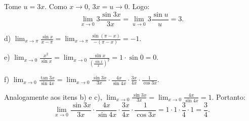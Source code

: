 \documentclass{article}
\begin{document}
{\begin{newpage}
\par
\vspace{0.3cm}
Tome $u = 3x$. Como $x\rightarrow 0$, $3x=u\rightarrow 0$. Logo:
\begin{equation*} \displaystyle{\lim_{x\to 0} 3\frac{\sin{3x}}{3x} = \lim_{u\to 0} 3\frac{\sin{u}}{u} = 3}.\end{equation*}
\par
\vspace{0.3cm}
d) $\displaystyle{\lim_{x\to \pi } \frac{\sin{x}}{x-\pi } = \lim_{x\to \pi } \frac{\sin (\pi - x)}{-(\pi - x)} = -1}$.
\par
\vspace{0.3cm}
e) $\displaystyle{\lim_{x\to 0} \frac{x^2}{\sin{x}} = \lim_{x\to 0} \frac{\sin{x}}{(\frac{\sin{x}}{x})^2} = 1\cdot \sin{0} = 0}$.
\par
\vspace{0.3cm}
f) $\displaystyle{\lim_{x\to 0} \frac{\tan{3x}}{\sin{4x}} = \lim_{x\to 0} \frac{\sin{3x}}{3x} \cdot \frac{4x}{\sin{4x}} \cdot \frac{3x}{4x} \cdot \frac{1}{\cos{3x}}}$.
\par
\vspace{0.3cm} Analogamente aos itens b) e c), $\displaystyle{\lim_{x\to 0}\frac{\sin{3x}}{3x} = \lim_{x\to 0} \frac{4x}{\sin{4x}} = 1}$. Portanto:
\begin{equation*} \displaystyle{\lim_{x\to 0}} \frac{\sin{3x}}{3x} \cdot \frac{4x}{\sin{4x}} \cdot \frac{3x}{4x} \cdot \frac{1}{\cos{3x}} = 1\cdot 1\cdot \frac{3}{4} \cdot 1 = \frac{3}{4} .\end{equation*}
\par

\end{newpage}}
\end{document}
